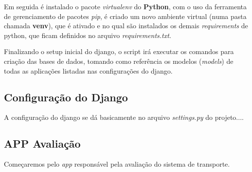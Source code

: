 Em seguida é instalado o pacote \textit{virtualenv} do \textbf{Python}, com o uso da ferramenta de gerenciamento de pacotes \textit{pip}, é criado um novo ambiente virtual (numa pasta chamada \textbf{venv}), que é ativado e no qual são instalados os demais \textit{requirements} de python, que ficam definidos no arquivo \textit{requirements.txt}.

Finalizando o setup inicial do \gls{django}, o script irá executar os comandos para criação das bases de dados, tomando como referência os modelos (\textit{models}) de todas as aplicações listadas nas configurações do django.

\subsection{Configuração do Django}
A configuração do django se dá basicamente no arquivo \textit{settings.py} do projeto....

\subsection{APP Avaliação}
Começaremos pelo  \textit{app} responsável pela avaliação do sistema de transporte.

